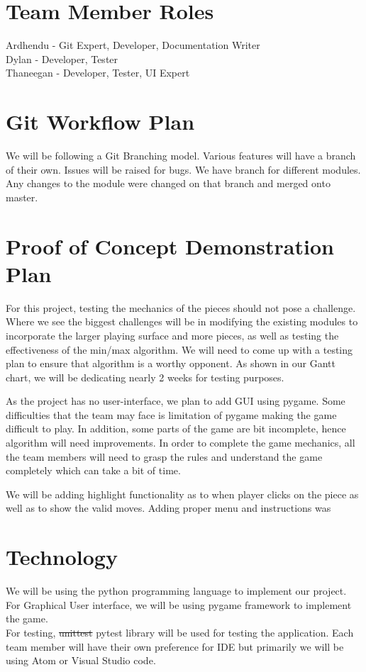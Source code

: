\documentclass{article}
\begin{document}
\section{Team Member Roles}
Ardhendu - Git Expert, Developer, {\color{blue} Documentation Writer}\\ 
Dylan - Developer, Tester \\
Thaneegan - Developer, Tester, UI Expert

\section{Git Workflow Plan}
We will be following a Git Branching model. Various features will have a branch of their own. Issues will be raised for bugs.{\color{blue} We have branch for different modules. Any changes to the module were changed on that branch and merged onto master.}

\section{Proof of Concept Demonstration Plan}
For this project, testing the mechanics of the pieces should not pose a challenge. Where we see the biggest challenges will be in modifying the existing modules to incorporate the larger playing surface and more pieces, as well as testing the effectiveness of the min/max algorithm. We will need to come up with a testing plan to ensure that algorithm is a worthy opponent. As shown in our Gantt chart, we will be dedicating nearly 2 weeks for testing purposes.

As the project has no user-interface, we plan to add GUI using pygame. Some difficulties that the team may face is limitation of pygame making the game difficult to play.
In addition, some parts of the game are bit incomplete, hence algorithm will need improvements. In order to complete the game mechanics, all the team members will need to grasp the rules and understand the game completely which can take a bit of time.

{\color{blue} We will be adding highlight functionality as to when player clicks on the piece as well as to show the valid moves. Adding proper menu and instructions was }

\section{Technology}
We will be using the python programming language to implement our project. \\
For Graphical User interface, we will be using pygame framework to implement the game. \\
For testing, \st{unittest} {\color{blue} pytest} library will be used for testing the application.
Each team member will have their own preference for IDE but primarily we will be using Atom or Visual Studio {\color{blue} code}.
\end{document}
